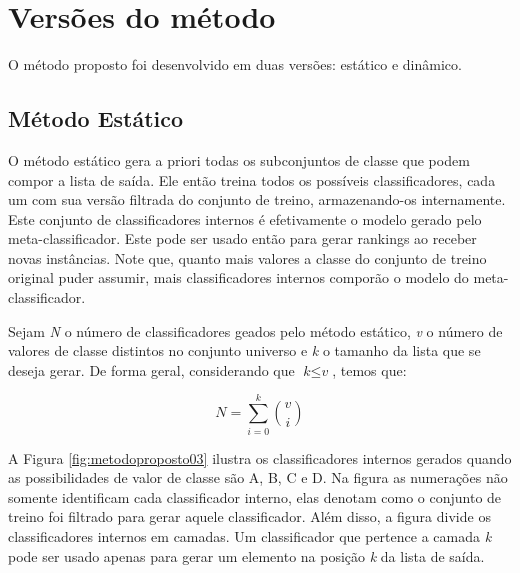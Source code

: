 \section{Versões do método}

O método proposto foi desenvolvido em duas versões: estático e dinâmico.


\subsection{Método Estático}

O método estático gera a priori todas os subconjuntos de classe que podem compor a lista de saída. Ele então treina todos os possíveis classificadores, cada um com sua versão filtrada do conjunto de treino, armazenando-os internamente. Este conjunto de classificadores internos é efetivamente o modelo gerado pelo meta-classificador. Este pode ser usado então para gerar rankings ao receber novas instâncias. Note que, quanto mais valores a classe do conjunto de treino original puder assumir, mais classificadores internos comporão o modelo do meta-classificador.

Sejam \textit{N} o número de classificadores geados pelo método estático, \textit{v} o número de valores de classe distintos no conjunto universo e \textit{k} o tamanho da lista que se deseja gerar. De forma geral, considerando que $\textit{k} \leq \textit{v}$, temos que:

\begin{equation*}

\textit{N} = \sum\limits_{i=0}^k \binom{v}{i}

\end{equation*}

A Figura \ref{fig:metodoproposto03} ilustra os classificadores internos gerados quando as possibilidades de valor de classe são A, B, C e D. Na figura as numerações não somente identificam cada classificador interno, elas denotam como o conjunto de treino foi filtrado para gerar aquele classificador. Além disso, a figura divide os classificadores internos em camadas. Um classificador que pertence a camada \textit{k} pode ser usado apenas para gerar um elemento na posição \textit{k} da lista de saída.

